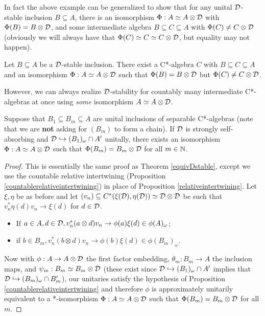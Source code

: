 \documentclass[12pt]{amsart}
\begin{document}
           In fact the above example can be generalized to show that for any unital $\mathcal{D}$-stable inclusion $B \subseteq A$, there is an isomorphism $\Phi: A \simeq A \otimes \mathcal{D}$ with $\Phi(B) = B \otimes \mathcal{D}$, and some intermediate algebra $B \subseteq C \subseteq A$ with $\Phi(C) \neq C \otimes \mathcal{D}$ (obviously we will always have that $\Phi(C) \simeq C \simeq C \otimes \mathcal{D}$, but equality may not happen).

             \begin{cor}
               Let $B \subseteq A$ be a $\mathcal{D}$-stable inclusion. There exist a C*-algebra $C$ with $B \subseteq C \subseteq A$ and an isomorphism $\Phi: A \simeq A \otimes \mathcal{D}$ such that $\Phi(B) = B \otimes \mathcal{D}$ but $\Phi(C) \neq C \otimes \mathcal{D}$. 
             \end{cor}


  However, we can always realize $\mathcal{D}$-stability for countably many intermediate C*-algebras at once using \emph{some} isomorphism $A \simeq A \otimes \mathcal{D}$.

  \begin{theorem}\label{countablymanysubalgebras}
      Suppose that $B_1 \subseteq B_m \subseteq A$ are unital inclusions of separable C*-algebras (note that we are {\bf not} asking for $(B_m)$ to form a chain). If $\mathcal{D}$ is strongly self-absorbing and $\mathcal{D} \hookrightarrow (B_1)_\omega \cap A'$ unitally, there exists an isomorphism $\Phi: A \simeq A \otimes \mathcal{D}$ such that $\Phi(B_m) = B_m \otimes \mathcal{D}$ for all $m \in \mathbb{N}$.
        \begin{proof}
          This is essentially the same proof as Theorem \ref{equivDstable}, except we use the countable relative intertwining (Proposition \ref{countablerelativeintertwining}) in place of Proposition \ref{relativeintertwining}. Let $\xi,\eta$ be as before and let $(v_n) \subseteq C^*(\xi(\mathcal{D}),\eta(\mathcal{D})) \simeq \mathcal{D} \otimes \mathcal{D}$ be such that $v_n^*\eta(d)v_n \to \xi(d)$ for $d \in \mathcal{D}$.
            \begin{itemize}
              \item If $a \in A, d \in \mathcal{D}, v_n^*(a \otimes d)v_n \to \phi(a)\xi(d) \in \phi(A)_\omega$;
              \item if $b \in B_m, v_n^*(b \otimes d)v_n \to \phi(b)\xi(d) \in \phi(B_m)_\omega$.
            \end{itemize}
            Now with  $\phi: A \to A \otimes \mathcal{D}$ the first factor embedding,  $\theta_m:B_m \to A$ the inclusion maps, and $\psi_m:B_m \simeq B_m \otimes \mathcal{D}$ (these exist since $\mathcal{D} \hookrightarrow (B_1)_\omega \cap A'$ implies that $\mathcal{D} \hookrightarrow (B_m)_\omega \cap B_m'$), our unitaries satisfy the hypothesis of Proposition \ref{countablerelativeintertwining} and therefore $\phi$ is approximately unitarily equivalent to a *-isomorphism $\Phi: A \simeq A \otimes \mathcal{D}$ such that $\Phi(B_m) = B_m \otimes \mathcal{D}$ for all $m$.
        \end{proof}
    \end{theorem}
\end{document}
